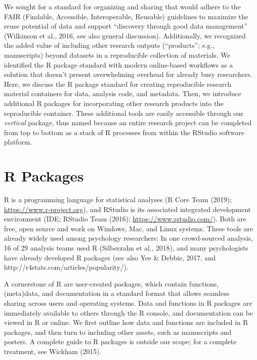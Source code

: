 \documentclass[
  english,
  jou,floatsintext]{apa6}
\begin{document}
We sought for a standard for organizing and sharing that would adhere to the FAIR (Findable, Accessible, Interoperable, Reusable) guidelines to maximize the reuse potential of data and support ``discovery through good data management'' (Wilkinson et al., 2016, see also general discussion). Additionally, we recognized the added value of including other research outputs (``products''; e.g., manuscripts) beyond datasets in a reproducible collection of materials. We identified the R package standard with modern online-based workflows as a solution that doesn't present overwhelming overhead for already busy researchers. Here, we discuss the R package standard for creating reproducible research material containers for data, analysis code, and metadata. Then, we introduce additional R packages for incorporating other research products into the reproducible container. These additional tools are easily accessible through our \emph{vertical} package, thus named because an entire research project can be completed from top to bottom as a stack of R processes from within the RStudio software platform.

\hypertarget{r-packages}{%
\section{R Packages}\label{r-packages}}

R is a programming language for statistical analyses (R Core Team (2019); \url{https://www.r-project.org}), and RStudio is its associated integrated development environment (IDE; RStudio Team (2016); \url{https://www.rstudio.com/}). Both are free, open source and work on Windows, Mac, and Linux systems. These tools are already widely used among psychology researchers: In one crowd-sourced analysis, 16 of 29 analysis teams used R (Silberzahn et al., 2018), and many psychologists have already developed R packages (see also Yee \& Debbie, 2017, and http://r4stats.com/articles/popularity/).

A cornerstone of R are user-created packages, which contain functions, (meta)data, and documentation in a standard format that allows seamless sharing across users and operating systems. Data and functions in R packages are immediately available to others through the R console, and documentation can be viewed in R or online. We first outline how data and functions are included in R packages, and then turn to including other assets, such as manuscripts and posters. A complete guide to R packages is outside our scope; for a complete treatment, see Wickham (2015).
\end{document}
